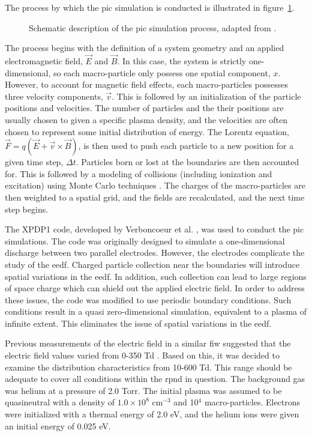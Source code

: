 The process by which the \acs{pic} simulation is conducted is illustrated in
figure~\ref{fig:pic}.
\begin{figure}
  \centering
  
  \caption{Schematic description of the \acs{pic} simulation process, adapted
    from \cite{Birdsall1991}.}
  \label{fig:pic}
\end{figure}
The process begins with the definition of a system geometry and an applied
electromagnetic field, $\vec{E}$ and $\vec{B}$. In this case, the system is
strictly one-dimensional, so each macro-particle only possess one spatial
component, $x$. However, to account for magnetic field effects, each
macro-particles possesses three velocity components, $\vec{v}$. This is followed
by an initialization of the particle positions and velocities. The number of
particles and the their positions are usually chosen to given a specific plasma
density, and the velocities are often chosen to represent some initial
distribution of energy. The Lorentz equation, $\vec{F} = q(\vec{E} +
\vec{v}\times\vec{B})$, is then used to push each particle to a new position for
a given time step, $\Delta t$. Particles born or lost at the boundaries are then
accounted for. This is followed by a modeling of collisions (including
ionization and excitation) using Monte Carlo techniques \cite{Birdsall1991}. The
charges of the macro-particles are then weighted to a spatial grid, and the
fields are recalculated, and the next time step begins.

The XPDP1 code, developed by Verboncoeur et al. \cite{Verboncoeur1993}, was used
to conduct the \acs{pic} simulations. The code was originally designed to
simulate a one-dimensional discharge between two parallel electrodes. However,
the electrodes complicate the study of the \acs{eedf}. Charged particle
collection near the boundaries will introduce spatial variations in the
\acs{eedf}. In addition, such collection can lead to large regions of space
charge which can shield out the applied electric field. In order to address
these issues, the code was modified to use periodic boundary conditions. Such
conditions result in a quasi zero-dimensional simulation, equivalent to a plasma
of infinite extent. This eliminates the issue of spatial variations in the
\acs{eedf}.

Previous measurements of the electric field in a similar \acs{fiw} suggested
that the electric field values varied from 0-350 Td \cite{Takashima2011}. Based
on this, it was decided to examine the distribution characteristics from 10-600
Td. This range should be adequate to cover all conditions within the \acs{rpnd}
in question. The background gas was helium at a pressure of 2.0 Torr. The
initial plasma was assumed to be quasineutral with a density of
$1.0\times10^{8}$ cm$^{-3}$ and 10$^4$ macro-particles. Electrons were
initialized with a thermal energy of 2.0 eV, and the helium ions were given an
initial energy of 0.025 eV. 

